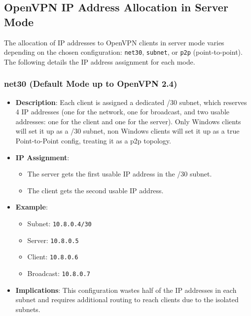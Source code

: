 \subsection{OpenVPN IP Address Allocation in Server Mode}

The allocation of IP addresses to OpenVPN clients in server mode varies depending on the chosen configuration: \texttt{net30}, \texttt{subnet}, or \texttt{p2p} (point-to-point). The following details the IP address assignment for each mode.

\subsubsection{net30 (Default Mode up to OpenVPN 2.4)}
\begin{itemize}
    \item \textbf{Description}: Each client is assigned a dedicated /30 subnet, which reserves 4 IP addresses (one for the network, one for broadcast, and two usable addresses: one for the client and one for the server). Only Windows clients will set it up as a /30 subnet, non Windows clients will set it up as a true Point-to-Point config, treating it as a p2p topology.
\item \textbf{IP Assignment}:
\begin{itemize}
        \item The server gets the first usable IP address in the /30 subnet.
        \item The client gets the second usable IP address.
\end{itemize}
\item \textbf{Example}:
\begin{itemize}
\item Subnet: \texttt{10.8.0.4/30}
\item Server: \texttt{10.8.0.5}
\item Client: \texttt{10.8.0.6}
\item Broadcast: \texttt{10.8.0.7}
\end{itemize}
\item \textbf{Implications}: This configuration wastes half of the IP addresses in each subnet and requires additional routing to reach clients due to the isolated subnets.
\end{itemize}

